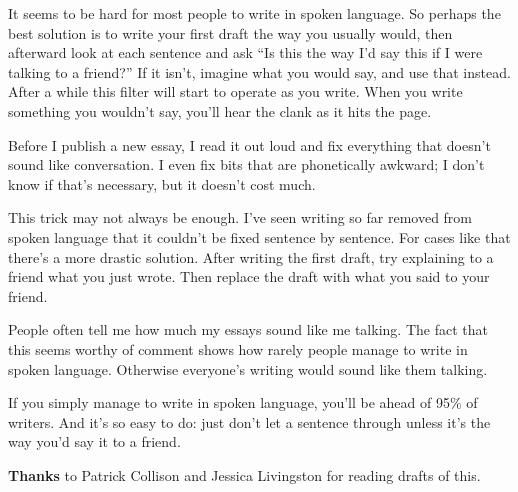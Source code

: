 It seems to be hard for most people to write in spoken language. So
perhaps the best solution is to write your first draft the way you
usually would, then afterward look at each sentence and ask ``Is this
the way I'd say this if I were talking to a friend?'' If it isn't,
imagine what you would say, and use that instead. After a while this
filter will start to operate as you write. When you write something you
wouldn't say, you'll hear the clank as it hits the page.

Before I publish a new essay, I read it out loud and fix everything that
doesn't sound like conversation. I even fix bits that are phonetically
awkward; I don't know if that's necessary, but it doesn't cost much.

This trick may not always be enough. I've seen writing so far removed
from spoken language that it couldn't be fixed sentence by sentence. For
cases like that there's a more drastic solution. After writing the first
draft, try explaining to a friend what you just wrote. Then replace the
draft with what you said to your friend.

People often tell me how much my essays sound like me talking. The fact
that this seems worthy of comment shows how rarely people manage to
write in spoken language. Otherwise everyone's writing would sound like
them talking.

If you simply manage to write in spoken language, you'll be ahead of
95\% of writers. And it's so easy to do: just don't let a sentence
through unless it's the way you'd say it to a friend.

\textbf{Thanks} to Patrick Collison and Jessica Livingston for reading
drafts of this.
